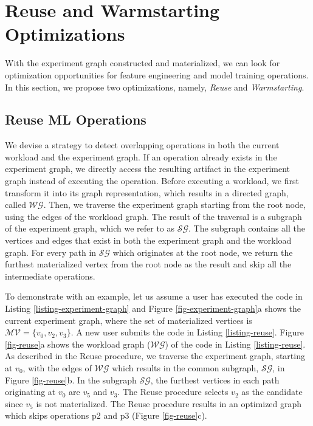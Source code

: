 \section{Reuse and Warmstarting Optimizations}\label{sec-reuse-and-warmstarting}
With the experiment graph constructed and materialized, we can look for optimization opportunities for feature engineering and model training operations.
In this section, we propose two optimizations, namely, \textit{Reuse} and \textit{Warmstarting}.

\subsection{Reuse ML Operations}
We devise a strategy to detect overlapping operations in both the current workload and the experiment graph.
If an operation already exists in the experiment graph, we directly access the resulting artifact in the experiment graph instead of executing the operation.
Before executing a workload, we first transform it into its graph representation, which results in a directed graph, called $\mathcal{WG}$.
Then, we traverse the experiment graph starting from the root node, using the edges of the workload graph.
The result of the traversal is a subgraph of the experiment graph, which we refer to as $\mathcal{SG}$.
The subgraph contains all the vertices and edges that exist in both the experiment graph and the workload graph.
For every path in $\mathcal{SG}$ which originates at the root node, we return the furthest materialized vertex from the root node as the result and skip all the intermediate operations.

To demonstrate with an example, let us assume a user has executed the code in Listing \ref{listing-experiment-graph} and Figure \ref{fig-experiment-graph}a shows the current experiment graph, where the set of materialized vertices is $\mathcal{MV} = \{v_0, v_2, v_3\}$.
A new user submits the code in Listing \ref{listing-reuse}.
Figure \ref{fig-reuse}a shows the workload graph ($\mathcal{WG}$) of the code in Listing \ref{listing-reuse}.
As described in the Reuse procedure, we traverse the experiment graph, starting at $v_0$, with the edges of $\mathcal{WG}$ which results in the common subgraph, $\mathcal{SG}$, in Figure \ref{fig-reuse}b.
In the subgraph $\mathcal{SG}$, the furthest vertices in each path originating at $v_0$ are $v_5$ and $v_3$.
The Reuse procedure selects $v_2$ as the candidate since $v_5$ is not materialized.
The Reuse procedure results in an optimized graph which skips operations p2 and p3 (Figure \ref{fig-reuse}c).

